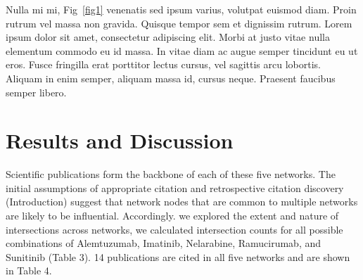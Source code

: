 \documentclass[10pt,letterpaper]{article}
\begin{document}
Nulla mi mi, Fig~\ref{fig1} venenatis sed ipsum varius, volutpat euismod diam. Proin rutrum vel massa non gravida. Quisque tempor sem et dignissim rutrum. Lorem ipsum dolor sit amet, consectetur adipiscing elit. Morbi at justo vitae nulla elementum commodo eu id massa. In vitae diam ac augue semper tincidunt eu ut eros. Fusce fringilla erat porttitor lectus cursus,  vel sagittis arcu lobortis. Aliquam in enim semper, aliquam massa id, cursus neque. Praesent faucibus semper libero.



\section*{Results and Discussion}

Scientific publications form the backbone of each of these five networks. The initial assumptions of appropriate citation and retrospective citation discovery (Introduction) suggest that network nodes that are common to multiple networks are likely to be influential. Accordingly. we explored the extent and nature of intersections across networks, we calculated intersection counts for all possible combinations of Alemtuzumab, Imatinib, Nelarabine, Ramucirumab, and Sunitinib (Table 3). 14 publications are cited in all five networks and are shown in Table 4. 
\end{document}
